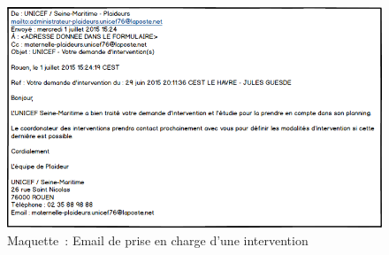 \begin{figure}[H]
	\centering
	\includegraphics[scale=0.675]{images/maquettes/fonctionnalite5MailDePriseEnCharge.png}
	\caption{Maquette~: Email de prise en charge d'une intervention}
\end{figure}
